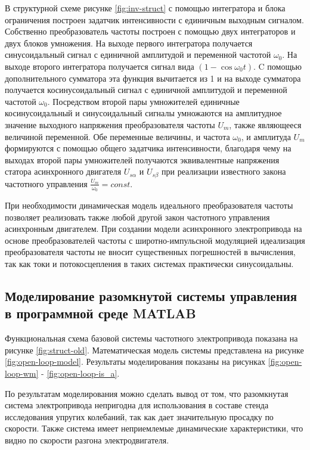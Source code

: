         В структурной схеме рисунке \ref{fig:inv-struct} с помощью интегратора
        и блока ограничения построен задатчик интенсивности с единичным
        выходным сигналом. Собственно преобразователь частоты построен с
        помощью двух интеграторов и двух блоков умножения. На выходе первого
        интегратора получается синусоидальный сигнал с единичной амплитудой и
        переменной частотой $\omega_0$. На выходе второго интегратора
        получается сигнал вида $(1-\cos \omega_0 t)$. C помощью дополнительного
        сумматора эта функция вычитается из 1 и на выходе сумматора получается
        косинусоидальный сигнал с единичной амплитудой и переменной частотой
        $\omega_0$. Посредством второй пары умножителей единичные
        косинусоидальный и синусоидальный сигналы умножаются на амплитудное
        значение выходного напряжения преобразователя частоты $U_m$, также
        являющееся величиной переменной. Обе переменные величины, и частота
        $\omega_0$, и амплитуда $U_m$ формируются с помощью общего задатчика
        интенсивности, благодаря чему на выходах второй пары умножителей
        получаются эквивалентные напряжения статора асинхронного двигателя
        $U_{s\alpha}$ и $U_{s\beta}$ при реализации известного закона
        частотного управления $\frac{U_m}{\omega_0} = const$. 

        При необходимости динамическая модель идеального преобразователя
        частоты позволяет реализовать также любой другой закон частотного
        управления асинхронным двигателем. При создании модели асинхронного
        электропривода на основе преобразователей частоты с широтно-импульсной
        модуляцией идеализация преобразователя частоты не вносит существенных
        погрешностей в вычисления, так как токи и потокосцепления в таких
        системах практически синусоидальны.

    \subsection{Моделирование разомкнутой системы управления в программной
        среде MATLAB}

        Функциональная схема базовой системы частотного электропривода показана
        на рисунке \ref{fig:struct-old}. Математическая модель системы представлена на 
        рисунке \ref{fig:open-loop-model}. Результаты моделирования показаны на рисунках
        \ref{fig:open-loop-wm} - \ref{fig:open-loop-is_a}.

        По результатам моделирования можно сделать вывод от том, что
        разомкнутая система электропривода непригодна для использования в
        составе стенда исследования упругих колебаний, так как дает
        значительную просадку по скорости. Также система имеет неприемлемые
        динамические характеристики, что видно по скорости разгона
        электродвигателя.
        
